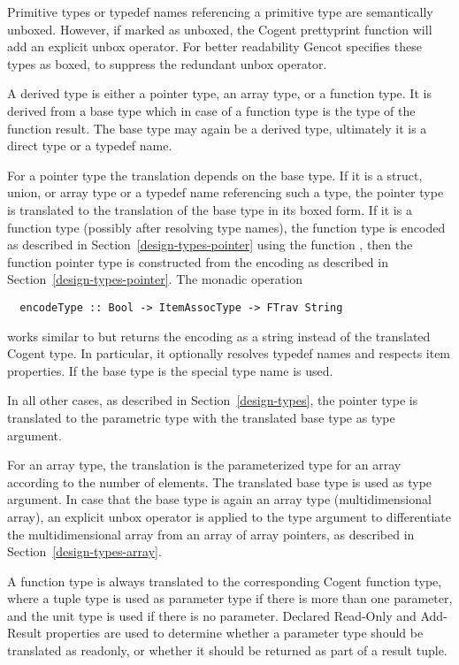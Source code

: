 Primitive types or typedef names referencing a primitive type are semantically unboxed. However, if marked as unboxed, 
the Cogent prettyprint function will add an explicit unbox operator. For better readability Gencot specifies these types
as boxed, to suppress the redundant unbox operator.

A derived type is either a pointer type, an array type, or a function type. It is derived from a base type
which in case of a function type is the type of the function result. The base type may again be a derived
type, ultimately it is a direct type or a typedef name.

For a pointer type the translation depends on the base type. If it is a struct, union, or array type or a typedef
name referencing such a type, the pointer type is translated to the translation of the base type in its
boxed form. If it is a function type (possibly after resolving type names), the function type
is encoded as described in Section~\ref{design-types-pointer} using the function , then the function
pointer type is constructed from the encoding as described in Section~\ref{design-types-pointer}. The monadic operation
\begin{verbatim}
  encodeType :: Bool -> ItemAssocType -> FTrav String
\end{verbatim}
works similar to  but returns the encoding as a string instead of the translated 
Cogent type. In particular, it optionally resolves typedef names and respects item properties.
If the base type is  the special type name  is used.

In all other cases, as described in Section~\ref{design-types}, 
the pointer type is translated to the parametric type  with the translated base type as type argument.

For an array type, the translation is the parameterized type for an array according to the number of elements. 
The translated base type is used as type argument. In case that the base type is again an array type (multidimensional
array), an explicit unbox operator is applied to the type argument to differentiate the multidimensional array 
from an array of array pointers, as described in Section~\ref{design-types-array}.

A function type is always translated to the corresponding Cogent function type, where a tuple type is
used as parameter type if there is more than one parameter, and the unit type is used if there is
no parameter. Declared Read-Only and Add-Result properties are used to determine whether a parameter type
should be translated as readonly, or whether it should be returned as part of a result tuple. 

